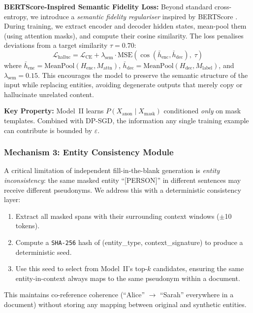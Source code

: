 \documentclass[9pt]{article}
\begin{document}
\textbf{BERTScore-Inspired Semantic Fidelity Loss:} Beyond standard cross-entropy, we introduce a \textit{semantic fidelity regulariser} inspired by BERTScore \cite{zhang2020bertscore}. During training, we extract encoder and decoder hidden states, mean-pool them (using attention masks), and compute their cosine similarity. The loss penalises deviations from a target similarity $\tau{=}0.70$:
\begin{equation}
    \mathcal{L}_{\text{halluc}} = \mathcal{L}_{\text{CE}} + \lambda_{\text{sem}} \cdot \text{MSE}\!\left(\cos(\bar{h}_{\text{enc}}, \bar{h}_{\text{dec}}),\; \tau\right)
\end{equation}
where $\bar{h}_{\text{enc}} = \text{MeanPool}(H_{\text{enc}}, M_{\text{attn}})$, $\bar{h}_{\text{dec}} = \text{MeanPool}(H_{\text{dec}}, M_{\text{label}})$, and $\lambda_{\text{sem}}{=}0.15$. This encourages the model to preserve the semantic structure of the input while replacing entities, avoiding degenerate outputs that merely copy or hallucinate unrelated content.

\textbf{Key Property:} Model~II learns $P(X_{\text{anon}} \mid X_{\text{mask}})$ conditioned \textit{only} on mask templates. Combined with DP-SGD, the information any single training example can contribute is bounded by $\varepsilon$.

\subsubsection{Mechanism 3: Entity Consistency Module}
A critical limitation of independent fill-in-the-blank generation is \textit{entity inconsistency}: the same masked entity ``[PERSON]'' in different sentences may receive different pseudonyms. We address this with a deterministic consistency layer:
\begin{enumerate}
    \item Extract all masked spans with their surrounding context windows ($\pm$10 tokens).
    \item Compute a \texttt{SHA-256} hash of (entity\_type, context\_signature) to produce a deterministic seed.
    \item Use this seed to select from Model~II's top-$k$ candidates, ensuring the same entity-in-context always maps to the same pseudonym within a document.
\end{enumerate}
This maintains co-reference coherence (``Alice'' $\rightarrow$ ``Sarah'' everywhere in a document) without storing any mapping between original and synthetic entities.
\end{document}
